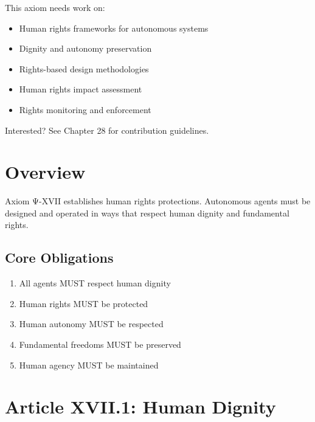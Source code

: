 \begin{tcolorbox}[colback=lightgray, colframe=accentgold, title=\textbf{🎯 Contribution Opportunity}]
This axiom needs work on:
\begin{itemize}
    \item Human rights frameworks for autonomous systems
    \item Dignity and autonomy preservation
    \item Rights-based design methodologies
    \item Human rights impact assessment
    \item Rights monitoring and enforcement
\end{itemize}

Interested? See Chapter 28 for contribution guidelines.
\end{tcolorbox}

\vspace{0.5cm}

\section{Overview}

Axiom Ψ-XVII establishes human rights protections. Autonomous agents must be designed and operated in ways that respect human dignity and fundamental rights.

\subsection{Core Obligations}

\begin{enumerate}
    \item All agents MUST respect human dignity
    \item Human rights MUST be protected
    \item Human autonomy MUST be respected
    \item Fundamental freedoms MUST be preserved
    \item Human agency MUST be maintained
\end{enumerate}

\vspace{0.5cm}

\section{Article XVII.1: Human Dignity}

